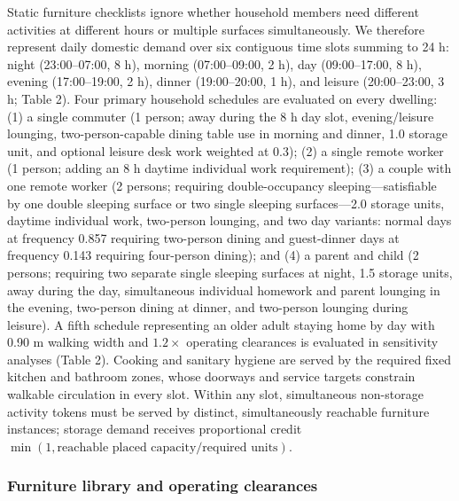 \documentclass[12pt,letterpaper]{article}
\begin{document}
Static furniture checklists ignore whether household members need different activities at different hours or multiple surfaces simultaneously. We therefore represent daily domestic demand over six contiguous time slots summing to 24 h: night (23:00--07:00, 8 h), morning (07:00--09:00, 2 h), day (09:00--17:00, 8 h), evening (17:00--19:00, 2 h), dinner (19:00--20:00, 1 h), and leisure (20:00--23:00, 3 h; Table 2). Four primary household schedules are evaluated on every dwelling: (1) a single commuter (1 person; away during the 8 h day slot, evening/leisure lounging, two-person-capable dining table use in morning and dinner, 1.0 storage unit, and optional leisure desk work weighted at 0.3); (2) a single remote worker (1 person; adding an 8 h daytime individual work requirement); (3) a couple with one remote worker (2 persons; requiring double-occupancy sleeping---satisfiable by one double sleeping surface or two single sleeping surfaces---2.0 storage units, daytime individual work, two-person lounging, and two day variants: normal days at frequency 0.857 requiring two-person dining and guest-dinner days at frequency 0.143 requiring four-person dining); and (4) a parent and child (2 persons; requiring two separate single sleeping surfaces at night, 1.5 storage units, away during the day, simultaneous individual homework and parent lounging in the evening, two-person dining at dinner, and two-person lounging during leisure). A fifth schedule representing an older adult staying home by day with 0.90 m walking width and \(1.2\times\) operating clearances is evaluated in sensitivity analyses (Table 2). Cooking and sanitary hygiene are served by the required fixed kitchen and bathroom zones, whose doorways and service targets constrain walkable circulation in every slot. Within any slot, simultaneous non-storage activity tokens must be served by distinct, simultaneously reachable furniture instances; storage demand receives proportional credit \(\min(1, \text{reachable placed capacity} / \text{required units})\).

\subsubsection{Furniture library and operating clearances}\label{furniture-library-and-operating-clearances}
\end{document}

